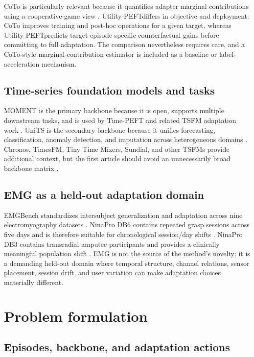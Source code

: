 \documentclass[10pt]{article}
\newcommand{\method}{Utility-PEFT}
\begin{document}
CoTo is particularly relevant because it quantifies adapter marginal contributions using a cooperative-game view \citep{zhuang2025coto}. \method differs in objective and deployment: CoTo improves training and post-hoc operations for a given target, whereas \method predicts target-episode-specific counterfactual gains before committing to full adaptation. The comparison nevertheless requires care, and a CoTo-style marginal-contribution estimator is included as a baseline or label-acceleration mechanism.

\subsection{Time-series foundation models and tasks}

MOMENT is the primary backbone because it is open, supports multiple downstream tasks, and is used by Time-PEFT and related TSFM adaptation work \citep{goswami2024moment}. UniTS is the secondary backbone because it unifies forecasting, classification, anomaly detection, and imputation across heterogeneous domains \citep{gao2024units}. Chronos, TimesFM, Tiny Time Mixers, Sundial, and other TSFMs provide additional context, but the first article should avoid an unnecessarily broad backbone matrix \citep{ansari2024chronos,das2024timesfm,ekambaram2024ttm,liu2025sundial}.

\subsection{EMG as a held-out adaptation domain}

EMGBench standardizes intersubject generalization and adaptation across nine electromyography datasets \citep{yang2024emgbench}. NinaPro DB6 contains repeated grasp sessions across five days and is therefore suitable for chronological session/day shifts \citep{palermo2017db6}. NinaPro DB3 contains transradial amputee participants and provides a clinically meaningful population shift \citep{atzori2015ninapro}. EMG is not the source of the method's novelty; it is a demanding held-out domain where temporal structure, channel relations, sensor placement, session drift, and user variation can make adaptation choices materially different.

\section{Problem formulation}

\subsection{Episodes, backbone, and adaptation actions}
\end{document}
